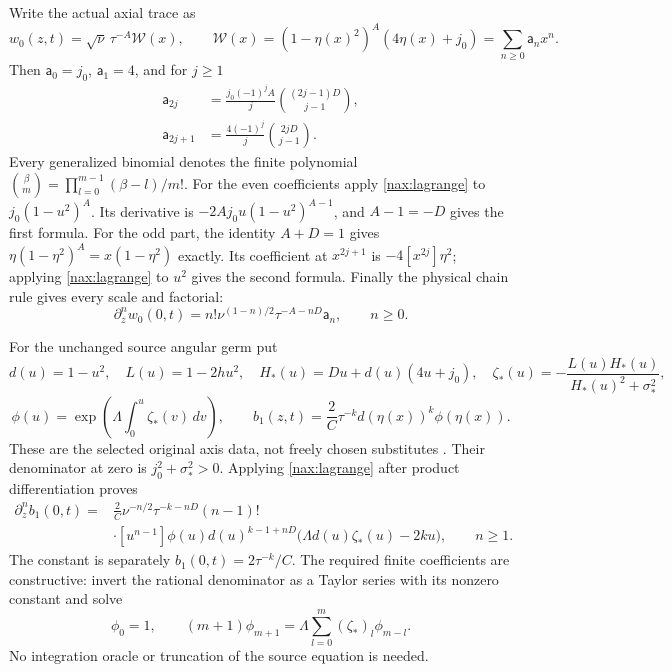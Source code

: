 Write the actual axial trace as
\[
 w_0(z,t)=\sqrt\nu\,\tau^{-A}\mathcal W(x),\qquad
 \mathcal W(x)=(1-\eta(x)^2)^A(4\eta(x)+j_0)
             =\sum_{n\geq0}\mathsf a_nx^n.
\]
Then $\mathsf a_0=j_0$, $\mathsf a_1=4$, and for $j\geq1$
\begin{equation}\label{nax:axial-coefficients}
 \begin{split}
 \mathsf a_{2j}&=\frac{j_0(-1)^jA}{j}
                      { (2j-1)D\choose j-1},\\
 \mathsf a_{2j+1}&=\frac{4(-1)^j}{j}
                      {2jD\choose j-1}.
 \end{split}
\end{equation}
Every generalized binomial denotes the finite polynomial
$\binom{\beta}{m}=\prod_{l=0}^{m-1}(\beta-l)/m!$.
For the even coefficients apply \eqref{nax:lagrange} to
$j_0(1-u^2)^A$. Its derivative is $-2Aj_0u(1-u^2)^{A-1}$,
and $A-1=-D$ gives the first formula. For the odd part, the
identity $A+D=1$ gives
$\eta(1-\eta^2)^A=x(1-\eta^2)$ exactly. Its coefficient at
$x^{2j+1}$ is $-4[x^{2j}]\eta^2$; applying
\eqref{nax:lagrange} to $u^2$ gives the second formula.
Finally the physical chain rule gives every scale and factorial:
\begin{equation}\label{nax:physical-derivatives}
 \partial_z^n w_0(0,t)
   =n!\nu^{(1-n)/2}\tau^{-A-nD}\mathsf a_n,\qquad n\geq0.
\end{equation}

For the unchanged source angular germ put
\[
 d(u)=1-u^2,\quad L(u)=1-2hu^2,\quad
 H_*(u)=Du+d(u)(4u+j_0),\quad
 \zeta_*(u)=-\frac{L(u)H_*(u)}{H_*(u)^2+\sigma_*^2},
\]
\[
 \phi(u)=\exp\left(\Lambda\int_0^u\zeta_*(v)\,dv\right),\qquad
 b_1(z,t)=\frac2C\tau^{-k}d(\eta(x))^k\phi(\eta(x)).
\]
These are the selected original axis data, not freely chosen substitutes
\cite[(B.1)--(B.3), (B.12)]{openaiNS2026release}. Their denominator
at zero is $j_0^2+\sigma_*^2>0$. Applying
\eqref{nax:lagrange} after product differentiation proves
\begin{equation}\label{nax:angular-derivatives}
 \begin{split}
 \partial_z^n b_1(0,t)
  ={}&\frac2C\nu^{-n/2}\tau^{-k-nD}(n-1)!\\
 &\cdot[u^{n-1}]\phi(u)d(u)^{k-1+nD}
       \bigl(\Lambda d(u)\zeta_*(u)-2ku\bigr),\qquad n\geq1.
 \end{split}
\end{equation}
The constant is separately $b_1(0,t)=2\tau^{-k}/C$. The required
finite coefficients are constructive: invert the rational denominator
as a Taylor series with its nonzero constant and solve
\[
 \phi_0=1,\qquad
 (m+1)\phi_{m+1}=\Lambda\sum_{l=0}^m(\zeta_*)_l\phi_{m-l}.
\]
No integration oracle or truncation of the source equation is needed.

